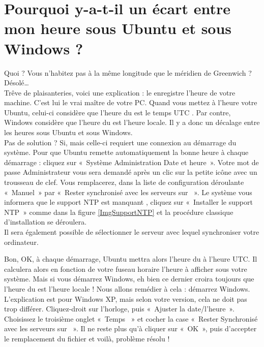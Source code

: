 \section{Pourquoi y-a-t-il un écart entre mon heure sous Ubuntu et sous Windows ?}
\label{RefHeureNTP}
Quoi ? Vous n'habitez pas à la même longitude que le méridien de Greenwich ? Désolé\ldots{}\\
Trêve de plaisanteries, voici une explication : le  enregistre l'heure de votre machine. C'est lui le vrai maître de votre PC. Quand vous mettez à l'heure votre Ubuntu, celui-ci considère que l'heure du  est le temps UTC . Par contre, Windows considère que l'heure du  est l'heure locale. Il y a donc un décalage entre les heures sous Ubuntu et sous Windows.\\Pas de solution ? Si, mais celle-ci requiert une connexion  au démarrage du système. Pour que Ubuntu remette automatiquement la bonne heure à chaque démarrage : cliquez sur «~Système \FlecheDroite Administration \FlecheDroite Date et heure~». Votre mot de passe Administrateur vous sera demandé après un clic sur la petite icône avec un trousseau de clef. Vous remplacerez, dans la liste de configuration déroulante «~Manuel~» par «~Rester synchronisé avec les serveurs sur ~». Le système vous informera que le support NTP est manquant , cliquez sur «~Installer le support NTP~» comme dans la figure \ref{ImgSupportNTP} et la procédure classique d'installation se déroulera.\\
Il sera également possible de sélectionner le serveur avec lequel synchroniser votre ordinateur.\par
{}
Bon, OK, à chaque démarrage, Ubuntu mettra alors l'heure du  à l'heure UTC. Il calculera alors en fonction de votre fuseau horaire l'heure à afficher sous votre système. Mais si vous démarrez Windows, eh bien ce dernier croira toujours que l'heure du  est l'heure locale ! Nous allons remédier à cela : démarrez Windows. L'explication est pour Windows XP, mais selon votre version, cela ne doit pas trop différer. Cliquez-droit sur l'horloge, puis «~Ajuster la date/l'heure~». Choisissez le troisième onglet «~Temps ~» et cocher la case «~Rester Synchronisé avec les serveurs sur ~». Il ne reste plus qu'à cliquer sur «~OK~», puis d'accepter le remplacement du fichier  et voilà, problème résolu !
